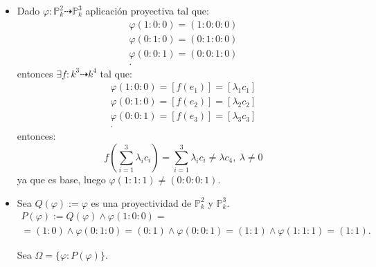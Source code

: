 \documentclass[10pt,a4paper,openright]{book}
\theoremstyle{break}
\begin{document}
\begin{itemize}
    \item 
Dado $\varphi: \mathbb{P}^{2}_{k} \dashrightarrow \mathbb{P}^{3}_{k}$ aplicación proyectiva tal que:
\begin{align*}
    \varphi \left( 1 : 0 : 0 \right) = \left( 1 : 0 : 0 : 0 \right)\\
    \varphi \left( 0 : 1 : 0 \right) = \left( 0 : 1 : 0 : 0 \right)\\ 
    \varphi \left( 0 : 0 : 1 \right) = \left( 0 : 0 : 1 : 0 \right)\\
.\end{align*}
entonces $\exists f: k^3 \dashrightarrow k^4$ tal que: 
\begin{align*}
    \varphi\left( 1 : 0 : 0 \right) = \left[ f\left( e_1 \right) \right] = \left[ \lambda_1c_1 \right]\\
    \varphi\left( 0 : 1 : 0 \right) = \left[ f\left( e_2 \right) \right] = \left[ \lambda_2c_2 \right]\\
    \varphi\left( 0 : 0 : 1 \right) = \left[ f\left( e_3 \right) \right] = \left[ \lambda_3c_3 \right]\\
.\end{align*}
entonces:
\[
f\left( \sum_{i=1}^{3} \lambda_ic_i \right) = \sum_{i=1}^{3} \lambda_ic_i \neq \lambda c_4,\ \lambda \neq 0 
\]
ya que es base, luego $\varphi\left( 1 : 1 : 1 \right) \neq \left( 0 : 0 : 0 : 1 \right)$.

    \item 
Sea $Q\left( \varphi \right) := \varphi$ es una proyectividad de $\mathbb{P}^{2}_{k}$ y $\mathbb{P}^{3}_{k}$. 
\begin{gather*}
P\left( \varphi \right) := Q\left( \varphi \right) \land \varphi\left( 1 : 0 : 0 \right) =\\
= \left( 1 : 0 \right) \land \varphi\left( 0 : 1 : 0 \right) = \left( 0 : 1 \right) \land \varphi\left( 0 : 0 : 1 \right) = \left( 1 : 1 \right) \land \varphi\left( 1 : 1 : 1 \right) = \left( 1 : 1 \right)     
.\end{gather*}

Sea $\Omega = \{\varphi : P\left( \varphi \right) \}$. 


\end{itemize}
\end{document}
